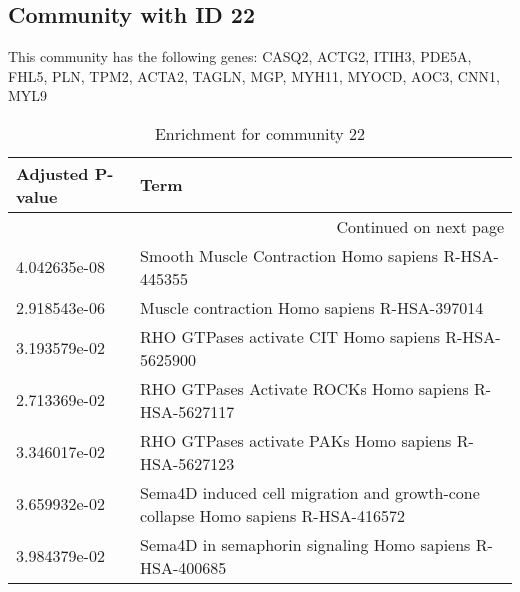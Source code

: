 \subsection*{Community with ID 22}
This community has the following genes: CASQ2, ACTG2, ITIH3, PDE5A, FHL5, PLN, TPM2, ACTA2, TAGLN, MGP, MYH11, MYOCD, AOC3, CNN1, MYL9
\\
\begin{longtable}{p{2.4cm}p{14.5cm}}
\caption{Enrichment for community 22}\\
\toprule
Adjusted \newline P-value &                                                                              Term \\
\midrule
\endhead
\midrule
\multicolumn{2}{r}{{Continued on next page}} \\
\midrule
\endfoot

\bottomrule
\endlastfoot
             4.042635e-08 &                               Smooth Muscle Contraction Homo sapiens R-HSA-445355 \\
             2.918543e-06 &                                      Muscle contraction Homo sapiens R-HSA-397014 \\
             3.193579e-02 &                               RHO GTPases activate CIT Homo sapiens R-HSA-5625900 \\
             2.713369e-02 &                             RHO GTPases Activate ROCKs Homo sapiens R-HSA-5627117 \\
             3.346017e-02 &                              RHO GTPases activate PAKs Homo sapiens R-HSA-5627123 \\
             3.659932e-02 &  Sema4D induced cell migration and growth-cone collapse Homo sapiens R-HSA-416572 \\
             3.984379e-02 &                          Sema4D in semaphorin signaling Homo sapiens R-HSA-400685 \\
\end{longtable}


